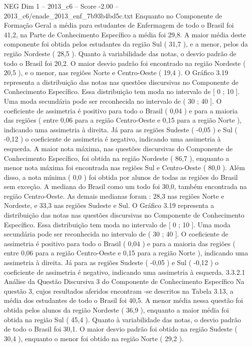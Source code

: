\begin{textsample}{NEG Dim 1 – 2013\_c6 – Score -2.00 – 2013\_c6/enade\_2013\_enf\_7b93b4bd5c.txt}
Enquanto no Componente de Formação Geral a média para estudantes de Enfermagem de todo o Brasil foi 41,2, na Parte de Conhecimento Específico a média foi 29,8.
A maior média deste componente foi obtida pelos estudantes da região Sul ( 31,7 ), e a menor, pelos da região Nordeste ( 28,5 ).
Quanto à variabilidade das notas, o desvio padrão de todo o Brasil foi 20,2.
O maior desvio padrão foi encontrado na região Nordeste ( 20,5 ), e o menor, nas regiões Norte e Centro-Oeste ( 19,4 ).
O Gráfico 3.19 representa a distribuição das notas nas questões discursivas no Componente de Conhecimento Específico.
Essa distribuição tem moda no intervalo de [ 0 ; 10 ].
Uma moda secundária pode ser reconhecida no intervalo de ( 30 ; 40 ].
O coeficiente de assimetria é positivo para todo o Brasil ( 0,04 ) e para a maioria das regiões ( entre 0,06 para a região Centro-Oeste e 0,15 para a região Norte ), indicando uma assimetria à direita.
Já para as regiões Sudeste ( -0,05 ) e Sul ( -0,12 ) o coeficiente de assimetria é negativo, indicando uma assimetria à esquerda.
A maior nota máxima, nas questões discursivas do Componente de Conhecimento Específico, foi obtida na região Nordeste ( 86,7 ), enquanto a menor nota máxima foi encontrada nas regiões Sul e Centro-Oeste ( 80,0 ).
Além disso, a nota mínima ( 0,0 ) foi obtida por alunos de todas as regiões do Brasil sem exceção.
A mediana do Brasil como um todo foi 30,0, também encontrada na região Centro-Oeste.
As demais medianas foram : 28,3 nas regiões Norte e Nordeste, e 33,3 nas regiões Sudeste e Sul.
O Gráfico 3.19 representa a distribuição das notas nas questões discursivas no Componente de Conhecimento Específico.
Essa distribuição tem moda no intervalo de [ 0 ; 10 ].
Uma moda secundária pode ser reconhecida no intervalo de ( 30 ; 40 ].
O coeficiente de assimetria é positivo para todo o Brasil ( 0,04 ) e para a maioria das regiões ( entre 0,06 para a região Centro-Oeste e 0,15 para a região Norte ), indicando uma assimetria à direita.
Já para as regiões Sudeste ( -0,05 ) e Sul ( -0,12 ) o coeficiente de assimetria é negativo, indicando uma assimetria à esquerda. 3.3.2.1 Análise da Questão Discursiva 3 do Componente de Conhecimento Específico Na questão 3, cujos resultados aferidos encontram -se descritos na Tabela 3.13, a média dos estudantes de todo o Brasil foi 40,5.
A menor média nessa questão foi obtida pelos alunos da região Nordeste ( 36,9 ), enquanto a maior média foi obtida na região Sul ( 45,4 ).
Quanto à variabilidade das notas, o desvio padrão de todo o Brasil foi 30,1.
O maior desvio padrão foi obtido na região Sudeste ( 30,4 ), enquanto o menor foi obtido na região Norte ( 29,2 ).

\end{textsample}
